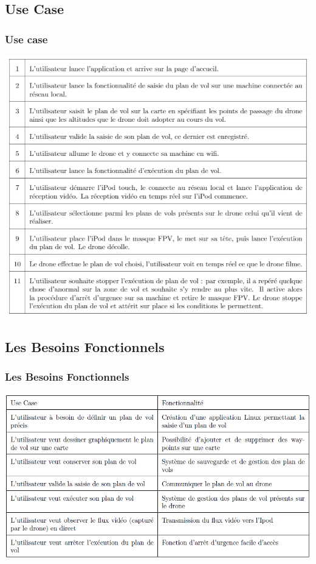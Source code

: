 \documentclass{beamer}
\begin{document}
	\begin{frame}
	\section{Use Case}
		\begin{center}
		\frametitle{Use case}
        \includegraphics[scale=0.52]{Use_Case.PNG}
       \end{center}
	\end{frame}
	\begin{frame}
	\section{Les Besoins Fonctionnels}
		\begin{center}
		\frametitle{Les Besoins Fonctionnels}
		\includegraphics[scale=0.47]{use_charges2.png}
				\end{center}
	\end{frame}
\end{document}
